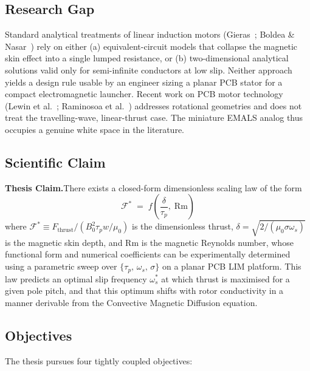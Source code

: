 \documentclass[12pt,letterpaper]{article}
\begin{document}
\subsection{Research Gap}

Standard analytical treatments of linear induction motors (Gieras~\cite{Gieras1994};
Boldea \& Nasar~\cite{Boldea2001}) rely on either (a) equivalent-circuit models that
collapse the magnetic skin effect into a single lumped resistance, or (b) two-dimensional
analytical solutions valid only for semi-infinite conductors at low slip. Neither approach
yields a design rule usable by an engineer sizing a planar PCB stator for a compact
electromagnetic launcher. Recent work on PCB motor technology (Lewin et
al.~\cite{Lewin2006}; Raminosoa et al.~\cite{Raminosoa2018}) addresses rotational
geometries and does not treat the travelling-wave, linear-thrust case. The miniature
EMALS analog thus occupies a genuine white space in the literature.

\subsection{Scientific Claim}

\begin{claimbox}
\textbf{Thesis Claim.}\quad There exists a closed-form dimensionless scaling law of the form
\[
  \mathcal{F}^* \;=\; f\!\left(\frac{\delta}{\tau_p},\; \mathrm{Rm}\right)
\]
where $\mathcal{F}^* \equiv F_{\mathrm{thrust}} / (B_0^2 \tau_p w / \mu_0)$ is the
dimensionless thrust, $\delta = \sqrt{2/(\mu_0\sigma\omega_s)}$ is the magnetic skin
depth, and $\mathrm{Rm}$ is the magnetic Reynolds number, whose functional form and
numerical coefficients can be experimentally determined using a parametric sweep over
$\{\tau_p,\,\omega_s,\,\sigma\}$ on a planar PCB LIM platform. This law predicts an
optimal slip frequency $\omega_s^*$ at which thrust is maximised for a given pole pitch,
and that this optimum shifts with rotor conductivity in a manner derivable from the
Convective Magnetic Diffusion equation.
\end{claimbox}

\subsection{Objectives}

The thesis pursues four tightly coupled objectives:
\end{document}

